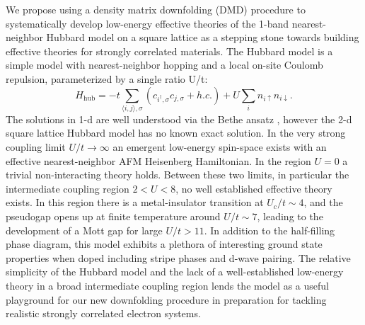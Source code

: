 \documentclass[12pt]{article}
\begin{document}
We propose using a density matrix downfolding (DMD) procedure to systematically develop low-energy effective theories of the 1-band nearest-neighbor Hubbard model on a square lattice as a stepping stone towards building effective theories for strongly correlated materials. 
The Hubbard model is a simple model with nearest-neighbor hopping and a local on-site Coulomb repulsion, parameterized by a single ratio U/t: 
\begin{equation}
H_\text{hub} = -t \sum_{\langle i,j \rangle,\sigma}( c_{i^\dagger,\sigma} c_{j,\sigma} + h.c.) + U \sum_i n_{i\uparrow} n_{i\downarrow}
\label{hubbard}.
\end{equation}
The solutions in 1-d are well understood via the Bethe ansatz , however the 2-d square lattice Hubbard model has no known exact solution.  
In the very strong coupling limit $U/t \rightarrow \infty$ an emergent low-energy spin-space exists with an effective nearest-neighbor AFM Heisenberg Hamiltonian. In the region $U = 0$ a trivial non-interacting theory holds. 
Between these two limits, in particular the intermediate coupling region $2 < U < 8$, no well established effective theory exists. 
In this region there is a metal-insulator transition at $U_c/t \sim 4$, and the pseudogap opens up at finite temperature around $U/t \sim 7$, leading to the development of a Mott gap for large $U/t > 11$. 
In addition to the half-filling phase diagram, this model exhibits a plethora of interesting ground state properties when doped including stripe phases and d-wave pairing. 
The relative simplicity of the Hubbard model and the lack of a well-established low-energy theory in a broad intermediate coupling region lends the model as a useful playground for our new downfolding procedure in preparation for tackling realistic strongly correlated electron systems. 
\end{document}
